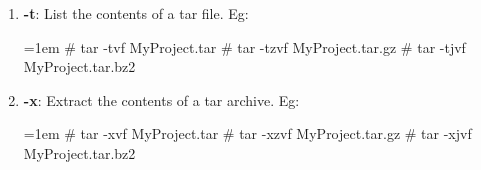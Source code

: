 \begin{flushleft}
\begin{itemize}
\begin{enumerate}
			\item \textbf{-t}: List the contents of a tar file.
			\newline
			Eg: 
			\begin{tcolorbox}[breakable,notitle,boxrule=-0pt,colback=black,colframe=black]
				\color{green}
				\font=1em
				\# tar -tvf MyProject.tar
				\newline
				\# tar -tzvf MyProject.tar.gz
				\newline
				\#  tar -tjvf MyProject.tar.bz2
				\font=4pt
			\end{tcolorbox}		

			\item \textbf{-x}: Extract the contents of a tar archive.
			\newline
			Eg:
			\begin{tcolorbox}[breakable,notitle,boxrule=-0pt,colback=black,colframe=black]
				\color{green}
				\font=1em
				\# tar -xvf MyProject.tar
				\newline
				\# tar -xzvf MyProject.tar.gz
				\newline
				\# tar -xjvf MyProject.tar.bz2
				\font=4pt
			\end{tcolorbox}		
		\end{enumerate}
		\bigskip

		
	\end{itemize} 
	
\end{flushleft}

\newpage

